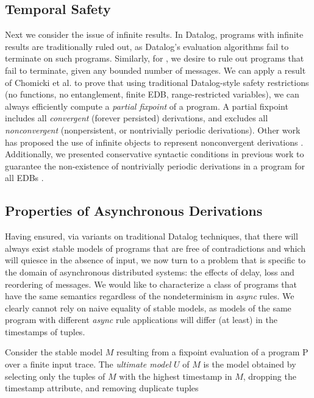 \subsection{Temporal Safety}

Next we consider the issue of infinite results.  In Datalog, programs with infinite results are traditionally ruled out, as Datalog's evaluation algorithms fail to terminate on such programs.  Similarly, for \lang, we desire to rule out programs that fail to terminate, given any bounded number of messages.  We can apply a result of Chomicki et al.  to prove that using traditional Datalog-style safety restrictions (no functions, no entanglement, finite EDB, range-restricted variables), we can always efficiently compute a {\em partial fixpoint} of a \lang program.  A partial fixpoint includes all {\em convergent} (forever persisted) derivations, and excludes all {\em nonconvergent} (nonpersistent, or nontrivially periodic derivations).  Other work has proposed the use of infinite objects to represent nonconvergent derivations .  Additionally, we presented conservative syntactic conditions in previous work to guarantee the non-existence of nontrivially periodic derivations in a program for all EDBs .

\subsection{Properties of Asynchronous Derivations}

Having ensured, via variants on traditional Datalog techniques, that there will always exist 
stable models  of \lang programs that are free of contradictions and which will quiesce in the absence of input, we now turn to a problem that is specific to the domain of asynchronous
distributed systems: the effects of delay, loss and reordering of messages. We would like to
characterize a class of \lang programs that have the same semantics regardless of
the nondeterminism in {\em async} rules.  We clearly cannot rely on naive equality of stable
models, as models of the same program with different {\em async} rule applications will differ
(at least) in the timestamps of tuples.

\begin{definition}
Consider the stable model $M$ resulting from a fixpoint evaluation of a \lang program P over a finite input trace.  The \emph{ultimate model} $U$ of $M$ is the model obtained by selecting only the tuples of $M$ with the highest timestamp in $M$, dropping the timestamp attribute,
and removing duplicate tuples
\end{definition}

